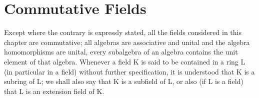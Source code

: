 \chapter{Commutative Fields}

Except where the contrary is expressly stated, all the fields considered in this chapter are commutative; all algebras are associative and unital and the algebra homomorphisms are unital, every subalgebra of an algebra contains the unit element of that algebra. Whenever a field K is said to be contained in a ring L (in particular in a field) without further specification, it is understood that K is a subring of L; we shall also say that K is a subfield of L, or also (if L is a field) that L is an extension field of K.

